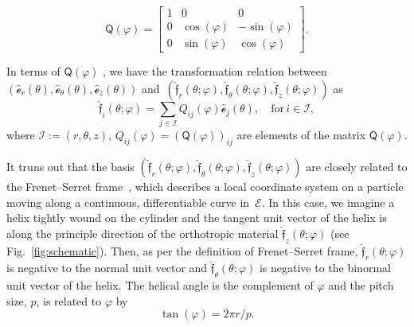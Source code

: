 \documentclass[preprint,10pt,times]{elsarticle}
\numberwithin{equation}{section}
\newcommand{\physe}{\hat{\mathscr{e}}} %
\newcommand{\physf}{\hat{\boldsymbol{\mathfrak{f}}}}
\renewcommand{\u}[1]{\boldsymbol{#1}}
\newcommand{\usf}[1]{\u{\mathsf #1}}
\newcommand{\pr}[1]{\left( #1 \right)}
\renewcommand{\>}{$\Rightarrow$}
\begin{document}
\begin{equation}
\usf{Q}(\varphi)
= \begin{bmatrix}
1 & 0 & 0 \\
 0 & \cos(\varphi) & -\sin(\varphi) \\
 0 & \sin(\varphi) & \cos(\varphi)
 \end{bmatrix}.
\end{equation}

In terms of $\usf{Q}(\varphi)$ , we have the transformation relation between~$(\physe_{r}(\theta),\physe_{\theta}(\theta),\physe_{z}(\theta))$ and~$\pr{\physf_{r}(\theta;\varphi),\physf_{\theta}(\theta;\varphi),\physf_{z}(\theta;\varphi)}$ as
\begin{equation}
\physf_{i} (\theta;\varphi) = \sum_{j \in \mathcal{I} } Q_{ij}(\varphi)\physe_{j}(\theta), \quad \text{for} \,i \in \mathcal{I} ,
\label{eq:Qtransform}
\end{equation}
where $\mathcal{I} :=\pr{r,\theta,z}$,  $Q_{ij}(\varphi) = \pr{\usf{Q}(\varphi)}_{ij}$ are elements of the matrix $\usf{Q}(\varphi)$.

It truns out that the basis $\pr{\physf_{r}(\theta;\varphi),\physf_{\theta}(\theta;\varphi),\physf_{z}(\theta;\varphi)}$ are closely related to the Frenet–Serret frame~\cite{forsyth1912lectures}, which describes a local coordinate system on a particle moving along a continuous, differentiable curve in~$\mathcal{E}$. In this case, we imagine a helix tightly wound on the cylinder and the tangent unit vector of the helix is along the principle direction of the orthotropic material $\physf_{z}(\theta;\varphi)$ (see Fig.~\ref{fig:schematic}). Then, as per the definition of Frenet–Serret frame, $\physf_{r}(\theta;\varphi)$ is negative to the normal unit vector and $\physf_{\theta}(\theta;\varphi)$ is negative to the binormal unit vector of the helix. 
The helical angle is the complement of $\varphi$ and the pitch size, $p$, is related to $\varphi$ by 
\begin{equation}
\tan(\varphi) = 2 \pi r/p.
\label{eq:AnglePitch}
\end{equation}
\end{document}
